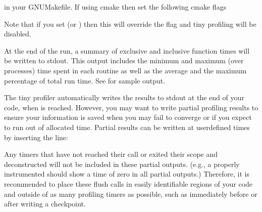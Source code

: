 \documentclass[letterpaper,10pt,english]{sphinxmanual}
\begin{document}
\begin{sphinxVerbatim}[commandchars=\\\{\}]
  
       
\end{sphinxVerbatim}

\sphinxAtStartPar
in your GNUMakefile.   If using cmake then set the following cmake flags

\begin{sphinxVerbatim}[commandchars=\\\{\}]
  
  
\end{sphinxVerbatim}

\sphinxAtStartPar
Note that if you set   (or ) then this will override the  flag and tiny profiling will
be disabled.

\sphinxAtStartPar
At the end of the run, a summary of exclusive and inclusive function times will
be written to stdout.  This output includes the minimum and maximum (over
processes) time spent in each routine as well as the average and the maximum
percentage of total run time.   See {\hyperref[\detokenize{AMReX_Profiling_Tools:sec-sample-tiny}]{}} for sample output.

\sphinxAtStartPar
The tiny profiler automatically writes the results to stdout at the end of your
code, when  is reached. However, you may want to write
partial profiling results to ensure your information is saved when you may fail
to converge or if you expect to run out of allocated time. Partial results can
be written at user\sphinxhyphen{}defined times by inserting the line:

\begin{sphinxVerbatim}[commandchars=\\\{\}]
\end{sphinxVerbatim}

\sphinxAtStartPar
Any timers that have not reached their  call or exited
their scope and deconstructed will not be included in these partial outputs.
(e.g., a properly instrumented  should show a time of zero in all
partial outputs.) Therefore, it is recommended to place these flush calls in
easily identifiable regions of your code and outside of as many profiling
timers as possible, such as immediately before or after writing a checkpoint.
\end{document}

